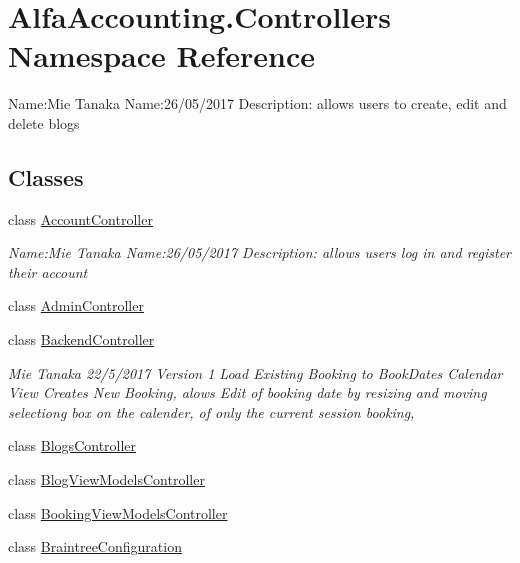 \hypertarget{namespace_alfa_accounting_1_1_controllers}{}\section{Alfa\+Accounting.\+Controllers Namespace Reference}
\label{namespace_alfa_accounting_1_1_controllers}


Name\+:Mie Tanaka Name\+:26/05/2017 Description\+: allows users to create, edit and delete blogs  


\subsection*{Classes}
\begin{DoxyCompactItemize}
\item 
class \hyperlink{class_alfa_accounting_1_1_controllers_1_1_account_controller}{Account\+Controller}
\begin{DoxyCompactList}\small\item\em Name\+:Mie Tanaka Name\+:26/05/2017 Description\+: allows users log in and register their account \end{DoxyCompactList}\item 
class \hyperlink{class_alfa_accounting_1_1_controllers_1_1_admin_controller}{Admin\+Controller}
\item 
class \hyperlink{class_alfa_accounting_1_1_controllers_1_1_backend_controller}{Backend\+Controller}
\begin{DoxyCompactList}\small\item\em Mie Tanaka 22/5/2017 Version 1 Load Existing Booking to Book\+Dates Calendar View Creates New Booking, alows Edit of booking date by resizing and moving selectiong box on the calender, of only the current session booking, \end{DoxyCompactList}\item 
class \hyperlink{class_alfa_accounting_1_1_controllers_1_1_blogs_controller}{Blogs\+Controller}
\item 
class \hyperlink{class_alfa_accounting_1_1_controllers_1_1_blog_view_models_controller}{Blog\+View\+Models\+Controller}
\item 
class \hyperlink{class_alfa_accounting_1_1_controllers_1_1_booking_view_models_controller}{Booking\+View\+Models\+Controller}
\item 
class \hyperlink{class_alfa_accounting_1_1_controllers_1_1_braintree_configuration}{Braintree\+Configuration}
\item 

\end{DoxyCompactItemize}
